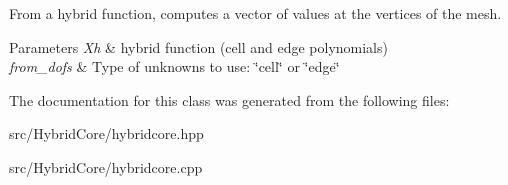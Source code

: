 From a hybrid function, computes a vector of values at the vertices of the mesh. 


\begin{DoxyParams}{Parameters}
{\em Xh} & hybrid function (cell and edge polynomials) \\
\hline
{\em from\+\_\+dofs} & Type of unknowns to use\+: \char`\"{}cell\char`\"{} or \char`\"{}edge\char`\"{} \\
\hline
\end{DoxyParams}


The documentation for this class was generated from the following files\+:\begin{DoxyCompactItemize}
\item 
src/\+Hybrid\+Core/hybridcore.\+hpp\item 
src/\+Hybrid\+Core/hybridcore.\+cpp\end{DoxyCompactItemize}
